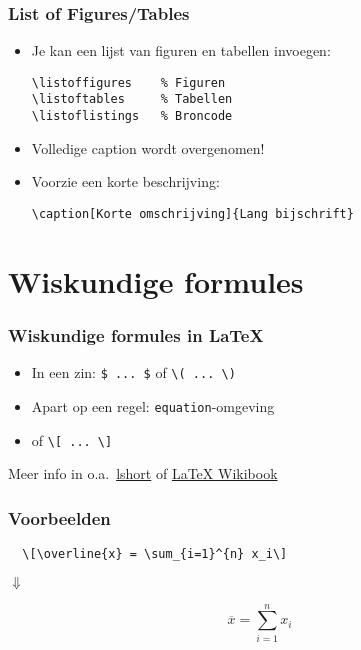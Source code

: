 \documentclass[aspectratio=169]{beamer}
\begin{document}
\begin{frame}[fragile]
  \frametitle{List of Figures/Tables}

  \begin{itemize}
    \item Je kan een lijst van figuren en tabellen invoegen:
          \begin{verbatim}
\listoffigures    % Figuren
\listoftables     % Tabellen
\listoflistings   % Broncode
\end{verbatim}
    \item Volledige caption wordt overgenomen!
    \item Voorzie een korte beschrijving:

          \verb|\caption[Korte omschrijving]{Lang bijschrift}|
  \end{itemize}

\end{frame}

\section{Wiskundige formules}

\begin{frame}[fragile]
  \frametitle{Wiskundige formules in {\LaTeX}}

  \begin{itemize}
    \item In een zin: \verb+$ ... $+ of \verb+\( ... \)+
    \item Apart op een regel: \texttt{equation}-omgeving
    \item of \verb+\[ ... \]+
  \end{itemize}

  Meer info in o.a.~\href{https://tobi.oetiker.ch/lshort/lshort.pdf}{lshort} of \href{https://en.wikibooks.org/wiki/LaTeX/Mathematics}{LaTeX Wikibook}

\end{frame}

\begin{frame}[fragile]
  \frametitle{Voorbeelden}

  \begin{verbatim}
  \[\overline{x} = \sum_{i=1}^{n} x_i\]
\end{verbatim}

  \bigskip

  \centering
  $\Downarrow$

  \bigskip

  \[\overline{x} = \sum_{i=1}^{n} x_i\]

\end{frame}
\end{document}
